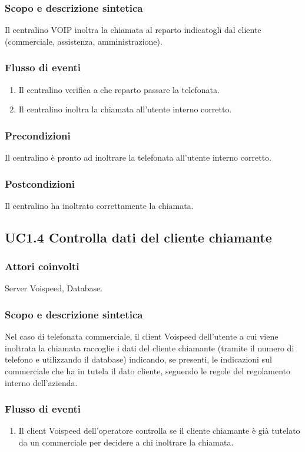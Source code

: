 \subsubsection*{Scopo e descrizione sintetica}
Il centralino VOIP  inoltra la chiamata al reparto indicatogli dal cliente (commerciale, assistenza, amministrazione).
\subsubsection*{Flusso di eventi}
\begin{enumerate}
\item Il centralino verifica a che reparto passare la telefonata.
\item Il centralino inoltra la chiamata all'utente interno corretto.
\end{enumerate}
\subsubsection*{Precondizioni} Il centralino \` e pronto ad inoltrare la telefonata all'utente interno corretto.
\subsubsection*{Postcondizioni} Il centralino ha inoltrato correttamente la chiamata.

\subsection*{UC1.4 Controlla dati del cliente chiamante}
\subsubsection*{Attori coinvolti} Server Voispeed, Database.
\subsubsection*{Scopo e descrizione sintetica}
Nel caso di telefonata commerciale, il client Voispeed dell'utente a cui viene inoltrata la chiamata raccoglie i dati del cliente chiamante (tramite il numero di telefono e utilizzando il database) indicando, se presenti, le indicazioni sul commerciale che ha in tutela il dato cliente, seguendo le regole del regolamento interno dell'azienda.
\subsubsection*{Flusso di eventi}
\begin{enumerate}
\item Il client Voispeed dell'operatore controlla se il cliente chiamante \` e gi\` a tutelato da un commerciale per decidere a chi inoltrare la chiamata.
\end{enumerate}
